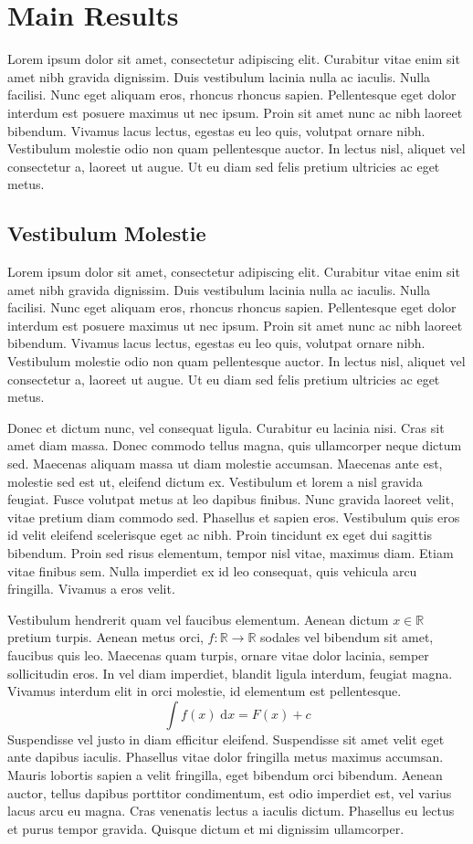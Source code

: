 \chapter{Main Results}

Lorem ipsum dolor sit amet, consectetur adipiscing elit. Curabitur vitae enim sit amet nibh gravida dignissim. Duis vestibulum lacinia nulla ac iaculis. Nulla facilisi. Nunc eget aliquam eros, rhoncus rhoncus sapien. Pellentesque eget dolor interdum est posuere maximus ut nec ipsum. Proin sit amet nunc ac nibh laoreet bibendum. Vivamus lacus lectus, egestas eu leo quis, volutpat ornare nibh. Vestibulum molestie odio non quam pellentesque auctor. In lectus nisl, aliquet vel consectetur a, laoreet ut augue. Ut eu diam sed felis pretium ultricies ac eget metus.

\section{Vestibulum Molestie}

Lorem ipsum dolor sit amet, consectetur adipiscing elit. Curabitur vitae enim sit amet nibh gravida dignissim. Duis vestibulum lacinia nulla ac iaculis. Nulla facilisi. Nunc eget aliquam eros, rhoncus rhoncus sapien. Pellentesque eget dolor interdum est posuere maximus ut nec ipsum. Proin sit amet nunc ac nibh laoreet bibendum. Vivamus lacus lectus, egestas eu leo quis, volutpat ornare nibh. Vestibulum molestie odio non quam pellentesque auctor. In lectus nisl, aliquet vel consectetur a, laoreet ut augue. Ut eu diam sed felis pretium ultricies ac eget metus.

Donec et dictum nunc, vel consequat ligula. Curabitur eu lacinia nisi. Cras sit amet diam massa. Donec commodo tellus magna, quis ullamcorper neque dictum sed. Maecenas aliquam massa ut diam molestie accumsan. Maecenas ante est, molestie sed est ut, eleifend dictum ex. Vestibulum et lorem a nisl gravida feugiat. Fusce volutpat metus at leo dapibus finibus. Nunc gravida laoreet velit, vitae pretium diam commodo sed. Phasellus et sapien eros. Vestibulum quis eros id velit eleifend scelerisque eget ac nibh. Proin tincidunt ex eget dui sagittis bibendum. Proin sed risus elementum, tempor nisl vitae, maximus diam. Etiam vitae finibus sem. Nulla imperdiet ex id leo consequat, quis vehicula arcu fringilla. Vivamus a eros velit.

Vestibulum hendrerit quam vel faucibus elementum. Aenean dictum  $x \in \mathbb{R}$ pretium turpis. Aenean metus orci, $f:\mathbb{R} \to \mathbb{R}$ sodales vel bibendum sit amet, faucibus quis leo. Maecenas quam turpis, ornare vitae dolor lacinia, semper sollicitudin eros. In vel diam imperdiet, blandit ligula interdum, feugiat magna. Vivamus interdum elit in orci molestie, id elementum est pellentesque. 
\[ \int f(x) \;\mathrm{d}x = F(x) + c \]
Suspendisse vel justo in diam efficitur eleifend. Suspendisse sit amet velit eget ante dapibus iaculis. Phasellus vitae dolor fringilla metus maximus accumsan. Mauris lobortis sapien a velit fringilla, eget bibendum orci bibendum. Aenean auctor, tellus dapibus porttitor condimentum, est odio imperdiet est, vel varius lacus arcu eu magna. Cras venenatis lectus a iaculis dictum. Phasellus eu lectus et purus tempor gravida. Quisque dictum et mi dignissim ullamcorper.

